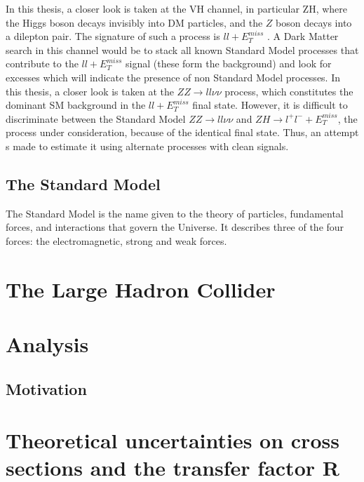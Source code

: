 \documentclass[11pt,a4paper]{report}
\newcommand{\ZZ}{$ZZ\to ll\nu\nu$ }
\newcommand{\llM}{$ll+E_T^{miss}$ }
\begin{document}
In this thesis, a closer look is taken at the VH channel, in particular ZH, where the Higgs boson decays invisibly into DM particles, and the $Z$ boson decays into a dilepton pair. The signature of such a process is \llM. A Dark Matter search in this channel would be to stack all known Standard Model processes that contribute to the \llM signal (these form the background) and look for excesses which will indicate the presence of non Standard Model processes. In this thesis, a closer look is taken at the \ZZ process, which constitutes the dominant SM background in the \llM final state. However, it is difficult to discriminate between the Standard Model \ZZ and $ZH\to l^+l^-+E_T^{miss}$, the process under consideration, because of the identical final state. Thus, an attempt s made to estimate it using alternate processes with clean signals.

\section{The Standard Model}
The Standard Model is the name given to the theory of particles, fundamental forces, and interactions that govern the Universe. It describes three of the four forces: the electromagnetic, strong and weak forces.

\cleardoublepage
\chapter{The Large Hadron Collider}
\cleardoublepage
\chapter{Analysis}
\section{Motivation}
\cleardoublepage
\chapter{Theoretical uncertainties on cross sections and the transfer factor R}
\end{document}
